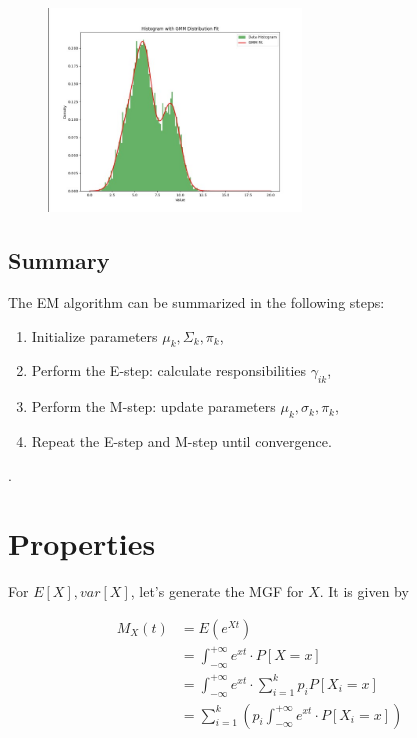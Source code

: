 \documentclass[openany]{book}
\begin{document}
        \begin{figure}
            \centering 
            \includegraphics*[width=0.6\textwidth]{photos/WhatsApp Image 2024-09-09 at 14.17.04.jpeg}
        \end{figure}
        
        \subsection*{Summary}
        
        The EM algorithm can be summarized in the following steps:
        \begin{enumerate}
            \item Initialize parameters \( \mu_k, \Sigma_k, \pi_k \),
            \item Perform the E-step: calculate responsibilities \( \gamma_{ik} \),
            \item Perform the M-step: update parameters \( \mu_k, \sigma_k, \pi_k \),
            \item Repeat the E-step and M-step until convergence.
        \end{enumerate}.
	
    \section{Properties}
        For $E[X], var[X]$, let's generate the MGF for $X$. It is given by 
        
        \begin{align*}
            M_X(t) &= E(e^{Xt})\\
            &= \int_{-\infty}^{+\infty} e^{xt} \cdot P[X=x]\\
            &= \int_{-\infty}^{+\infty} e^{xt} \cdot \sum_{i=1}^{k} p_i P[X_i=x] \\
            &= \sum_{i=1}^{k} (p_i \int_{-\infty}^{+\infty} e^{xt} \cdot P[X_i=x]) \\
        \end{align*}
        
\end{document}
